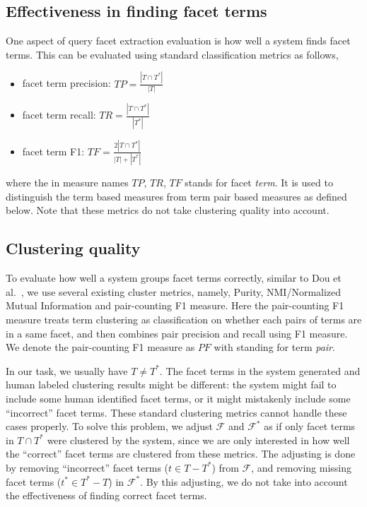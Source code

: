 \subsection{Effectiveness in finding facet terms}
\label{sec:intrinsic-tmeasures}
One aspect of query facet extraction evaluation is how well a system finds facet terms. This can be evaluated using standard classification metrics as follows,
\begin{itemize}
 \item facet term precision: $T\!P=\frac{|T \cap T^*|}{|T|}$
 \item facet term recall: $T\!R=\frac{|T \cap T^*|}{|T^*|}$
 \item facet term F1: $T\!F=\frac{2|T \cap T^*|}{|T|+|T^*|}$
\end{itemize}
where the  in measure names $T\!P$, $T\!R$, $T\!F$ stands for facet \emph{term}. It is used to distinguish the term based measures from term pair based measures as defined below. Note that these metrics do not take clustering quality into account.

\subsection{Clustering quality}
\label{sec:intrinsic-pmeasures}
To evaluate how well a system groups facet terms correctly,
similar to Dou et al.~\cite{dou2011finding}, we use several existing cluster metrics, namely, Purity, NMI/Normalized Mutual Information and pair-counting F1 measure. Here the pair-counting F1 measure treats term clustering as classification on whether each pairs of terms are in a same facet, and then combines pair precision and recall using F1 measure. We denote the pair-counting F1 measure as $P\!F$ with  standing for term \emph{pair}.


In our task, we usually have $T\neq T^*$. The facet terms in the system generated and human labeled clustering results might be different: the system might fail to include some human identified facet terms, or it might mistakenly include some ``incorrect'' facet terms. These standard clustering metrics cannot handle these cases properly. To solve this problem, we adjust $\mathcal{F}$ and $\mathcal{F}^*$ as if only facet terms in $T \cap T^{*}$ were clustered by the system, since we are only interested in how well the ``correct'' facet terms are clustered from these metrics. The adjusting is done by removing ``incorrect'' facet terms ($t \in T-T^*$) from $\mathcal{F}$, and removing missing facet terms ($t^{*}\in T^*-T$) in $\mathcal{F}^{*}$.  By this adjusting, we do not take into account the effectiveness of finding correct facet terms.

